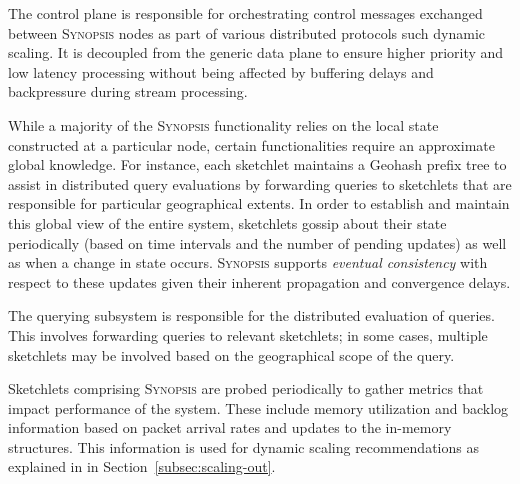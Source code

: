\begin{description}[leftmargin=*]
	\item[Control plane:] The control plane is responsible for orchestrating control messages exchanged between \textsc{Synopsis} nodes as part of various distributed protocols such dynamic scaling.
    It is decoupled from the generic data plane to ensure higher priority and low latency processing without being affected by buffering delays and backpressure during stream processing.

	\item[Gossip subsystem:] While a majority of the \textsc{Synopsis} functionality relies on the local state constructed at a particular node, certain functionalities require an approximate global knowledge.
    For instance, each sketchlet maintains a Geohash prefix tree to assist in distributed query evaluations by forwarding queries to sketchlets that are responsible for particular geographical extents.
        In order to establish and maintain this global view of the entire system, sketchlets gossip about their state periodically (based on time intervals and the number of pending updates) as well as when a change in state occurs.
    \textsc{Synopsis} supports \emph{eventual consistency} with respect to these updates given their inherent propagation and convergence delays.

	\item[Querying subsystem:] The querying subsystem is responsible for the distributed evaluation of queries.
    This involves forwarding queries to relevant sketchlets; in some cases, multiple sketchlets may be involved based on the geographical scope of the query.

    \item[Monitoring subsystem:] Sketchlets comprising \textsc{Synopsis} are probed periodically to gather metrics that impact performance of the system.
    These include memory utilization and backlog information based on packet arrival rates and updates to the in-memory structures.
    This information is used for dynamic scaling recommendations as explained in in Section~\ref{subsec:scaling-out}.
\end{description}
